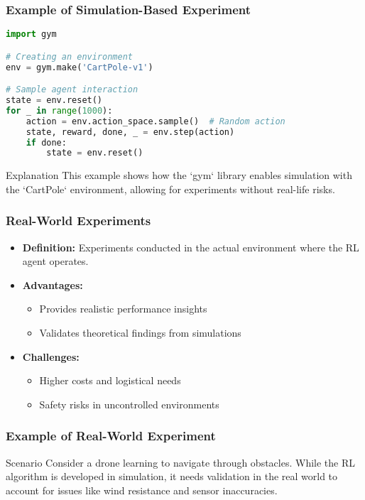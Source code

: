 \documentclass[aspectratio=169]{beamer}
\begin{document}
\begin{frame}[fragile]
    \frametitle{Example of Simulation-Based Experiment}
    \begin{lstlisting}[language=Python]
import gym

# Creating an environment
env = gym.make('CartPole-v1')

# Sample agent interaction
state = env.reset()
for _ in range(1000):
    action = env.action_space.sample()  # Random action
    state, reward, done, _ = env.step(action)
    if done:
        state = env.reset()
    \end{lstlisting}
    \begin{block}{Explanation}
        This example shows how the `gym` library enables simulation with the `CartPole` environment, allowing for experiments without real-life risks.
    \end{block}
\end{frame}

\begin{frame}
    \frametitle{Real-World Experiments}
    \begin{itemize}
        \item \textbf{Definition:} Experiments conducted in the actual environment where the RL agent operates.
        \item \textbf{Advantages:}
        \begin{itemize}
            \item Provides realistic performance insights
            \item Validates theoretical findings from simulations
        \end{itemize}
        \item \textbf{Challenges:}
        \begin{itemize}
            \item Higher costs and logistical needs
            \item Safety risks in uncontrolled environments
        \end{itemize}
    \end{itemize}
\end{frame}

\begin{frame}
    \frametitle{Example of Real-World Experiment}
    \begin{block}{Scenario}
        Consider a drone learning to navigate through obstacles. While the RL algorithm is developed in simulation, it needs validation in the real world to account for issues like wind resistance and sensor inaccuracies.
    \end{block}
\end{frame}
\end{document}
